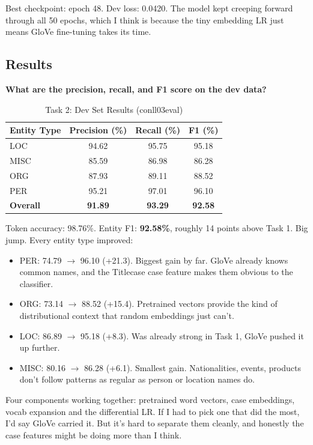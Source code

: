 \documentclass[11pt]{article}
\begin{document}
Best checkpoint: epoch 48. Dev loss: 0.0420. The model kept creeping forward through all 50 epochs, which I think is because the tiny embedding LR just means GloVe fine-tuning takes its time.

\subsection{Results}

\textbf{What are the precision, recall, and F1 score on the dev data?}

\begin{table}[h]
\centering
\caption{Task 2: Dev Set Results (conll03eval)}
\label{tab:res2}
\begin{tabular}{lccc}
\toprule
\textbf{Entity Type} & \textbf{Precision (\%)} & \textbf{Recall (\%)} & \textbf{F1 (\%)} \\
\midrule
LOC & 94.62 & 95.75 & 95.18 \\
MISC & 85.59 & 86.98 & 86.28 \\
ORG & 87.93 & 89.11 & 88.52 \\
PER & 95.21 & 97.01 & 96.10 \\
\midrule
\textbf{Overall} & \textbf{91.89} & \textbf{93.29} & \textbf{92.58} \\
\bottomrule
\end{tabular}
\end{table}

Token accuracy: 98.76\%. Entity F1: \textbf{92.58\%}, roughly 14 points above Task 1. Big jump. Every entity type improved:

\begin{itemize}[nosep]
\item PER: 74.79 $\rightarrow$ 96.10 (+21.3). Biggest gain by far. GloVe already knows common names, and the Titlecase case feature makes them obvious to the classifier.
\item ORG: 73.14 $\rightarrow$ 88.52 (+15.4). Pretrained vectors provide the kind of distributional context that random embeddings just can't.
\item LOC: 86.89 $\rightarrow$ 95.18 (+8.3). Was already strong in Task 1, GloVe pushed it up further.
\item MISC: 80.16 $\rightarrow$ 86.28 (+6.1). Smallest gain. Nationalities, events, products don't follow patterns as regular as person or location names do.
\end{itemize}

Four components working together: pretrained word vectors, case embeddings, vocab expansion and the differential LR. If I had to pick one that did the most, I'd say GloVe carried it. But it's hard to separate them cleanly, and honestly the case features might be doing more than I think.
\end{document}

